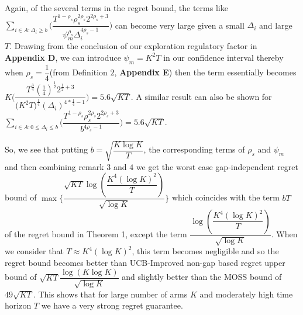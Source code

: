 \begin{remark}
Again, of the several terms in the regret bound, the terms like  $\sum_{i\in A:\Delta_{i}\geq b}\bigg(\dfrac{T^{1-\rho_{s}}\rho_{s}^{2\rho_{s}}2^{2\rho_{s}+3}}{\psi_{m}^{\rho_{s}}\Delta_{i}^{4\rho_{s}-1}} \bigg)$ can become very large given a small $\Delta_{i}$ and large $T$. Drawing from the conclusion of our exploration regulatory factor in \textbf{Appendix D}, we can introduce $\psi_{m}=K^{2}T$ in our confidence interval thereby when $\rho_{s}=\dfrac{1}{4}$(from Definition $2$, \textbf{Appendix E}) then the term essentially becomes $K\bigg(\dfrac{T^{\frac{3}{4}}(\frac{1}{4})^{\frac{1}{2}}2^{\frac{1}{2}+3}}{{(K^{2}T})^{\frac{1}{4}}{(\Delta_{i})^{4*\frac{1}{4}-1}}} \bigg) = 5.6\sqrt{KT}$. A similar result can also be shown for $\sum_{i\in A:0\leq\Delta_{i}\leq b}\bigg(\dfrac{T^{1-\rho_{s}}\rho_{s}^{2\rho_{s}}2^{2\rho_{s}+3}}{b^{4\rho_{s} -1}} \bigg)=5.6\sqrt{KT}$. 
\end{remark}

\begin{remark}
So, we see that putting $b=\sqrt{\dfrac{K\log K}{T}}$, the corresponding terms of $\rho_{s}$ and $\psi_{m}$ and then combining remark $3$ and $4$ we get the worst case gap-independent regret bound of $\max\lbrace \dfrac{\sqrt{KT}\log{(\dfrac{K^{4}(\log K)^{2}}{T})}}{\sqrt{\log K}}\rbrace$ which coincides with the term $bT$ of the regret bound in Theorem 1, except the term  $\dfrac{\log{(\dfrac{K^{4}(\log K)^{2}}{T})}}{\sqrt{\log K}}$. When we consider that $T\approx K^{4}(\log K)^{2}$, this term becomes negligible and so the regret bound becomes better than UCB-Improved non-gap based regret upper bound of $\sqrt{KT}\dfrac{\log(K\log K)}{\sqrt{\log K}}$ and slightly better than the MOSS bound of $49\sqrt{KT}$. This shows that for large number of arms $K$ and moderately high time horizon $T$ we have a very strong regret guarantee.
\end{remark}


